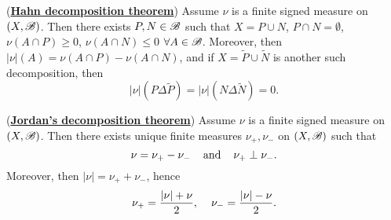 \begin{theorem}(\underline{\textbf{Hahn decomposition theorem}})
    Assume $\nu$ is a finite signed measure on $(X,\mathscr{B})$. Then there exists $P,N\in\mathscr{B}$ such that
    $X=P\cup N$, $P\cap N=\emptyset$, $\nu(A\cap P)\geq 0$, $\nu(A\cap N)\leq 0$ $\forall A\in \mathscr{B}$.
    Moreover, then $|\nu|(A) = \nu(A\cap P)-\nu(A\cap N)$, and if $X=\tilde P\cup \tilde N$ is another such decomposition, then 
    $$|\nu|(P\Delta \tilde P)=|\nu|(N\Delta \tilde N)=0.$$
\end{theorem}

\begin{corollary}(\underline{\textbf{Jordan's decomposition theorem}})
    Assume $\nu$ is a finite signed measure on $(X,\mathscr{B})$. Then there exists unique finite measures $\nu_+,\nu_-$ on $(X,\mathscr{B})$ such that 
    $$\nu = \nu_+ -\nu_-\hspace{4mm} \text{and}\hspace{4mm} \nu_+\perp\nu_-.$$
    Moreover, then $|\nu| = \nu_+ +\nu_-$, hence $$\nu_+ = \frac{|\nu|+\nu}{2},\hspace{4mm} \nu_-=\frac{|\nu|-\nu}{2}.$$
    
\end{corollary}